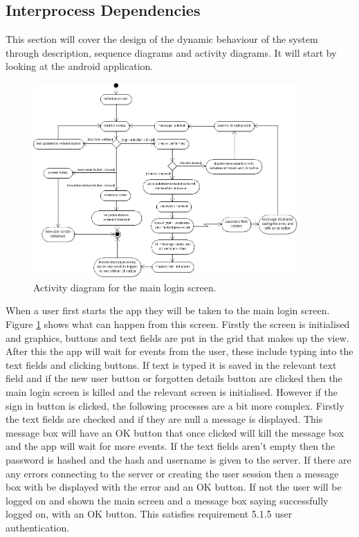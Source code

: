 \setcounter{section}{3}
\setcounter{subsection}{1}

\subsection{Interprocess Dependencies}
This section will cover the design of the dynamic behaviour of the system through description, sequence diagrams and activity diagrams. It will start by looking at the android application.

\begin{figure}[h!]
    \centering
    \includegraphics[width=0.9\textwidth]{images/activity/main-login}
    \caption{Activity diagram for the main login screen.}
    \label{fig:mainLogin}
\end{figure}

When a user first starts the app they will be taken to the main login screen. Figure \ref{fig:mainLogin} shows what can happen from this screen. Firstly the screen is initialised and graphics, buttons and text fields are put in the grid that makes up the view. After this the app will wait for events from the user, these include typing into the text fields and clicking buttons. If text is typed it is saved in the relevant text field and if the new user button or forgotten details button are clicked then the main login screen is killed and the relevant screen is initialised. However if the sign in button is clicked, the following processes are a bit more complex. Firstly the text fields are checked and if they are null a message is displayed. This message box will have an OK button that once clicked will kill the message box and the app will wait for more events. If the text fields aren't empty then the password is hashed and the hash and username is given to the server. If there are any errors connecting to the server or creating the user session then a message box with be displayed with the error and an OK button. If not the user will be logged on and shown the main screen and a message box saying successfully logged on, with an OK button. This satisfies requirement 5.1.5 user authentication.

